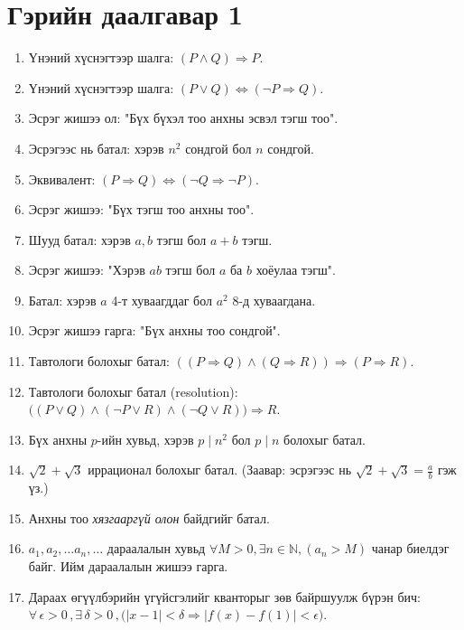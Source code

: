 \newpage
\section*{Гэрийн даалгавар 1 }
\begin{enumerate}
  \item Үнэний хүснэгтээр шалга: $(P\land Q)\Rightarrow P$.
  \item Үнэний хүснэгтээр шалга: $(P\lor Q)\Leftrightarrow(\lnot P\Rightarrow Q)$.
  \item Эсрэг жишээ ол: "Бүх бүхэл тоо анхны эсвэл тэгш тоо".
  \item Эсрэгээс нь батал: хэрэв $n^2$ сондгой бол $n$ сондгой.
  \item Эквивалент: $(P\Rightarrow Q)\Leftrightarrow(\lnot Q\Rightarrow\lnot P)$.
  \item Эсрэг жишээ: "Бүх тэгш тоо анхны тоо".
  \item Шууд батал: хэрэв $a,b$ тэгш бол $a+b$ тэгш.
  \item Эсрэг жишээ: "Хэрэв $ab$ тэгш бол $a$ ба $b$ хоёулаа тэгш".
  \item Батал: хэрэв $a$ 4-т хуваагддаг бол $a^2$ 8-д хуваагдана.
  \item Эсрэг жишээ гарга: "Бүх анхны тоо сондгой".
  \item Тавтологи болохыг батал: $((P\Rightarrow Q)\land(Q\Rightarrow R))\Rightarrow(P\Rightarrow R)$.
  \item Тавтологи болохыг батал (resolution): $\big((P\lor Q)\land(\lnot P\lor R)\land(\lnot Q\lor R)\big)\Rightarrow R$.
  \item Бүх анхны $p$-ийн хувьд, хэрэв $p\mid n^2$ бол $p\mid n$ болохыг батал.
  \item $\sqrt{2}+\sqrt{3}$ иррационал болохыг батал.
        (Заавар: эсрэгээс нь $\sqrt{2}+\sqrt{3}=\tfrac{a}{b}$ гэж үз.)
  \item Анхны тоо \emph{хязгааргүй олон} байдгийг батал.
  \item $a_1, a_2, \ldots a_n, \ldots$ дараалалын хувьд $\forall M > 0, \exists n \in \mathbb{N}, (a_n > M)$ чанар биелдэг байг. Ийм дараалалын жишээ гарга.
   \item Дараах өгүүлбэрийн үгүйсгэлийг кванторыг зөв байршуулж бүрэн бич:\\
        $\forall\,\epsilon>0\, , \exists\,\delta>0\, , \big(|x-1|<\delta \Rightarrow |f(x)-f(1)|<\epsilon\big)$.
   
\end{enumerate}